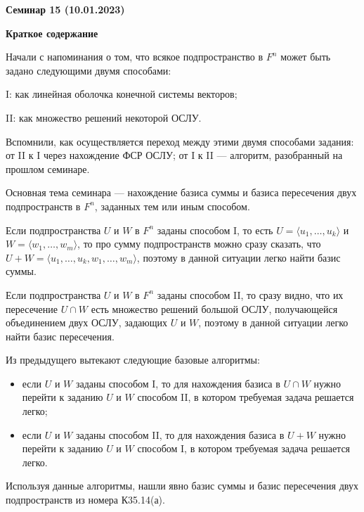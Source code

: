 \documentclass[10pt, a4paper]{extarticle}
\theoremstyle{definition}
\begin{document}
\begin{center}
\small
\noindent{}
\end{center}

\large

\begin{center}
\textbf{Семинар 15 (10.01.2023)}
\end{center}

\textbf{Краткое содержание}

Начали с напоминания о том, что всякое подпространство в $F^n$ может быть задано следующими двумя способами:

I: как линейная оболочка конечной системы векторов;

II: как множество решений некоторой ОСЛУ.

Вспомнили, как осуществляется переход между этими двумя способами задания: от II к I через нахождение ФСР ОСЛУ; от I к II --- алгоритм, разобранный на прошлом семинаре. 

Основная тема семинара --- нахождение базиса суммы и базиса пересечения двух подпространств в $F^n$, заданных тем или иным способом.

Если подпространства $U$ и $W$ в $F^n$ заданы способом I, то есть $U = \langle u_1,\dots, u_k \rangle$ и $W = \langle w_1,\dots, w_m \rangle$, 
то про сумму подпространств можно сразу сказать, что $U+W = \langle u_1,\dots, u_k, w_1,\dots, w_m \rangle$, поэтому в данной ситуации легко найти базис суммы.

Если подпространства $U$ и $W$ в $F^n$ заданы способом II, то сразу видно, что их пересечение $U \cap W$ есть множество решений большой ОСЛУ, 
получающейся объединением двух ОСЛУ, задающих $U$ и $W$, поэтому в данной ситуации легко найти базис пересечения.

Из предыдущего вытекают следующие базовые алгоритмы:
\begin{itemize}
\item
если $U$ и $W$ заданы способом I, то для нахождения базиса в $U \cap W$ нужно перейти к заданию $U$ и $W$ способом II, в котором требуемая задача решается легко;

\item
если $U$ и $W$ заданы способом II, то для нахождения базиса в $U + W$ нужно перейти к заданию $U$ и $W$ способом I, в котором требуемая задача решается легко.
\end{itemize}

Используя данные алгоритмы, нашли явно базис суммы и базис пересечения двух подпространств из номера К35.14(а).
\end{document}
